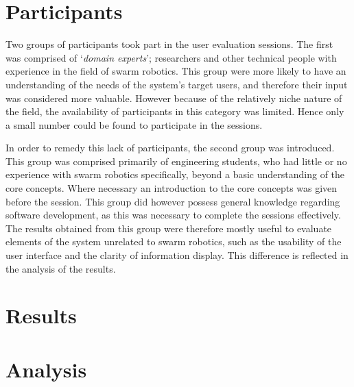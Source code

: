 \section{Participants}

Two groups of participants took part in the user evaluation sessions. The first was comprised of `\textit{domain experts}'; researchers and other technical people with experience in the field of swarm robotics. This group were more likely to have an understanding of the needs of the system's target users, and therefore their input was considered more valuable. However because of the relatively niche nature of the field, the availability of participants in this category was limited. Hence only a small number could be found to participate in the sessions.

In order to remedy this lack of participants, the second group was introduced. This group was comprised primarily of engineering students, who had little or no experience with swarm robotics specifically, beyond a basic understanding of the core concepts. Where necessary an introduction to the core concepts was given before the session. This group did however possess general knowledge regarding software development, as this was necessary to complete the sessions effectively. The results obtained from this group were therefore mostly useful to evaluate elements of the system unrelated to swarm robotics, such as the usability of the user interface and the clarity of information display. This difference is reflected in the analysis of the results.


\section{Results}





\section{Analysis}




